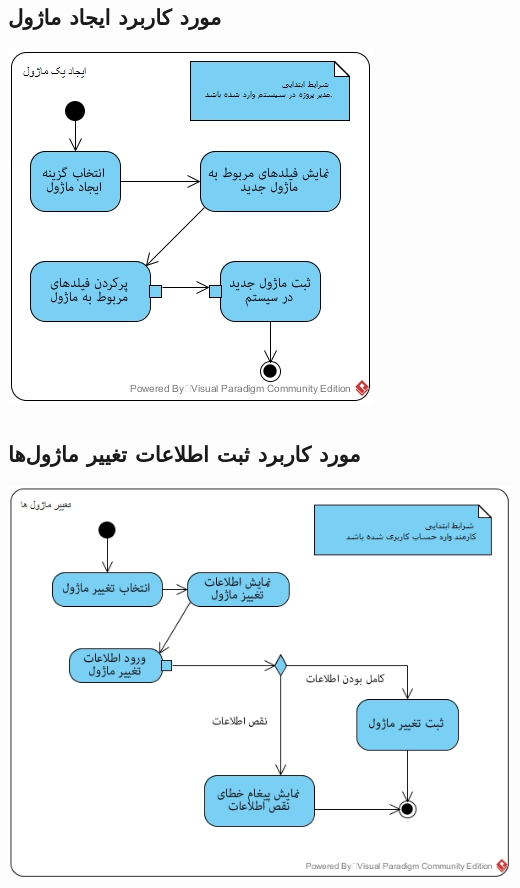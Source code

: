 \documentclass{article}
\begin{document}
\subsection*{مورد کاربرد ایجاد ماژول}
\vspace{2cm}
\begin{center}
\includegraphics[width=\textwidth]{ActivityDiagrams/27.jpg}
\end{center}


\newpage
\vspace{2cm}
\subsection*{مورد کاربرد ثبت اطلاعات تغییر ماژول‌ها}
\vspace{2cm}
\begin{center}
\includegraphics[width=\textwidth]{ActivityDiagrams/28.jpg}
\end{center}
\end{document}
